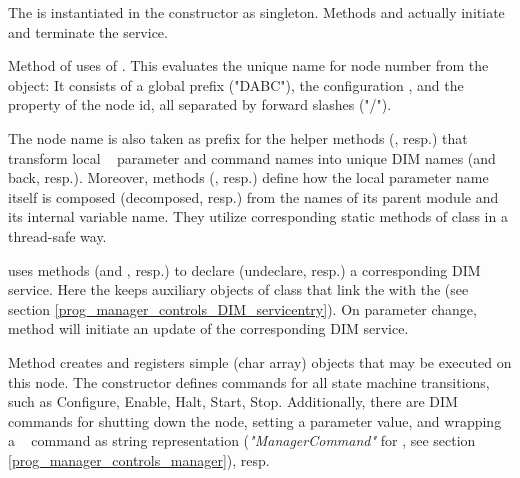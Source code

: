 \begin{compactenum}

\item The  is instantiated in the constructor as	 
singleton. Methods  and  
actually initiate and terminate the service. 

\item {}
Method  of  
uses  of .
This evaluates the unique name for node number  
from the  object: It consists of
a global prefix ("DABC"), the configuration , and the
 property of the node id,
all separated by forward slashes ("/").

The node name is also taken as prefix for the helper
methods  (, resp.) that 
transform local \dabc~ parameter and command names 
into unique DIM names (and back, resp.). 
Moreover, methods 
(, resp.) define how
the local parameter name itself is composed (decomposed, resp.) from the names
of its parent module and its internal variable name. They
utilize corresponding static methods of class 
in a thread-safe way.

     
\item {} 
uses methods  (and
, resp.) to declare (undeclare, resp.) 
a corresponding DIM service. Here the 
keeps auxiliary objects of class 
 that link the  with the  (see section \ref{prog_manager_controls_DIM_servicentry}). 
On parameter change, method 
 will initiate an update of the corresponding DIM
service.
    
\item {} Method  
creates and registers simple (char array)  objects
that may be executed on this node. The  constructor
defines commands for all state machine transitions, 
such as Configure, Enable, Halt, Start, Stop. Additionally, there are DIM commands for
shutting down the node, setting a parameter value, and
wrapping a \dabc~ 
command as string representation ({\em "ManagerCommand"} for ,
see section \ref{prog_manager_controls_manager}), resp.


\end{compactenum}
